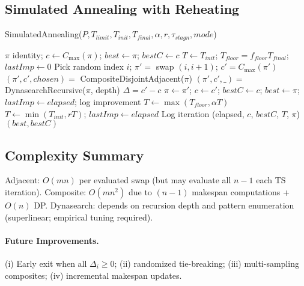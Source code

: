 \subsection{Simulated Annealing with Reheating}
\begin{algorithm}[h]
  \caption{SimulatedAnnealing($P, T_{limit}, T_{init}, T_{final}, \alpha, r, \tau_{stagn}, mode$)}
  \begin{algorithmic}[1]
    \State $\pi$ identity; $c \gets C_{\max}(\pi)$; $best \gets \pi$; $bestC \gets c$
    \State $T \gets T_{init}$; $T_{floor} = f_{floor} T_{final}$; $lastImp \gets 0$
        \State Pick random index $i$; $\pi' =$ swap $(i,i+1)$; $c' = C_{\max}(\pi')$
        \State $(\pi', c', chosen) =$ CompositeDisjointAdjacent($\pi$)
        \State $(\pi', c', \_) =$ DynasearchRecursive($\pi$, depth)
      \EndIf
      \State $\Delta = c' - c$
        \State $\pi \gets \pi'$; $c \gets c'$;  $bestC \gets c$; $best \gets \pi$; $lastImp \gets elapsed$; log improvement \EndIf
      \EndIf
      \State $T \gets \max(T_{floor}, \alpha T)$
        \State $T \gets \min(T_{init}, r T)$; $lastImp \gets elapsed$
      \EndIf
      \State Log iteration (elapsed, $c$, $bestC$, $T$, $\pi$)
    \EndWhile
    \State \Return $(best, bestC)$
  \end{algorithmic}
\end{algorithm}

\subsection{Complexity Summary}
Adjacent: $O(mn)$ per evaluated swap (but may evaluate all $n{-}1$ each TS iteration).
Composite: $O(m n^2)$ due to $(n{-}1)$ makespan computations + $O(n)$ DP.
Dynasearch: depends on recursion depth and pattern enumeration (superlinear; empirical tuning required).

\paragraph{Future Improvements.} (i) Early exit when all $\Delta_i \ge 0$; (ii) randomized tie-breaking; (iii) multi-sampling composites; (iv) incremental makespan updates.
